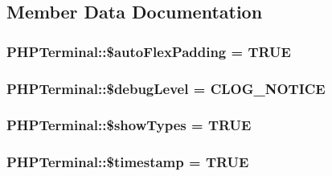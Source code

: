 \subsection{Member Data Documentation}
\hypertarget{classPHPTerminal_abcc3682a3a16fb50d6e426edb48d7978}{
\subsubsection[{\$auto\-Flex\-Padding}]{\setlength{\rightskip}{0pt plus 5cm}P\-H\-P\-Terminal\-::\$auto\-Flex\-Padding = T\-R\-U\-E\hspace{0.3cm}{\ttfamily [private]}}}\label{classPHPTerminal_abcc3682a3a16fb50d6e426edb48d7978}
\hypertarget{classPHPTerminal_a2908526616c7fa61c417d403863e28d1}{
\subsubsection[{\$debug\-Level}]{\setlength{\rightskip}{0pt plus 5cm}P\-H\-P\-Terminal\-::\$debug\-Level = {\bf C\-L\-O\-G\-\_\-\-N\-O\-T\-I\-C\-E}\hspace{0.3cm}{\ttfamily [private]}}}\label{classPHPTerminal_a2908526616c7fa61c417d403863e28d1}
\hypertarget{classPHPTerminal_ade6d0afca6c874aef63cc9a164bfc155}{
\subsubsection[{\$show\-Types}]{\setlength{\rightskip}{0pt plus 5cm}P\-H\-P\-Terminal\-::\$show\-Types = T\-R\-U\-E\hspace{0.3cm}{\ttfamily [private]}}}\label{classPHPTerminal_ade6d0afca6c874aef63cc9a164bfc155}
\hypertarget{classPHPTerminal_aa512306f7594a0e6d04795eb8235fd44}{
\subsubsection[{\$timestamp}]{\setlength{\rightskip}{0pt plus 5cm}P\-H\-P\-Terminal\-::\$timestamp = T\-R\-U\-E\hspace{0.3cm}{\ttfamily [private]}}}\label{classPHPTerminal_aa512306f7594a0e6d04795eb8235fd44}
